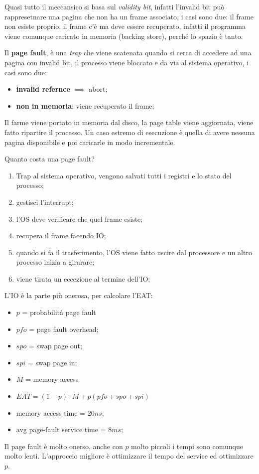 \documentclass[12pt]{article}
\begin{document}
Quasi tutto il meccansico si basa sul \emph{validity bit}, infatti l'invalid bit pu\`o rappresetnare una pagina che non ha un frame associato, i casi sono due: il frame non esiste proprio, il frame c'\`e ma deve essere recuperato, infatti il programma viene comunque caricato in memoria (backing store), perch\'e lo spazio \`e tanto.

\hfill

Il \textbf{page fault}, \`e una \emph{trap} che viene scatenata quando si cerca di accedere ad una pagina con invalid bit, il processo viene bloccato e da via al sistema operativo, i casi sono due:
\begin{itemize}
  \item \textbf{invalid refernce} $ \implies$ abort;
  \item \textbf{non in memoria}: viene recuperato il frame;
\end{itemize}
Il farme viene portato in memoria dal disco, la page table viene aggiornata, viene fatto ripartire il processo. Un caso estremo di esecuzione \`e quella di avere nessuna pagina disponibile e poi caricarle in modo incrementale.

Quanto costa una page fault?
\begin{enumerate}
  \item Trap al sistema operativo, vengono salvati tutti i registri e lo stato del processo;
  \item gestisci l'interrupt;
  \item l'OS deve verificare che quel frame esiste;
  \item recupera il frame facendo IO;
  \item quando si fa il trasferimento, l'OS viene fatto uscire dal processore e un altro processo inizia a girarare;
  \item viene tirata un eccezione al termine dell'IO;
\end{enumerate}
L'IO \`e la parte pi\`u onerosa, per calcolare l'EAT:
\begin{itemize}
  \item $p$ = probabilit\`a page fault
  \item $pfo$ = page fault overhead;
  \item $spo$ = swap page out;
  \item $spi$ = swap page in;
  \item $M$ = memory access
  \item $EAT = (1-p)\cdot M + p (pfo + spo + spi)$
\end{itemize}
\begin{example}{}{}
  \begin{itemize}
    \item memory access time = $20ns$;
    \item avg page-fault service time = $8ms$;
  \end{itemize}

  Il page fault \`e molto onerso, anche con $p$ molto piccoli i tempi sono comunque molto lenti. L'approccio migliore \`e ottimizzare il tempo del service ed ottimizzare $p$.
\end{example}
\end{document}
